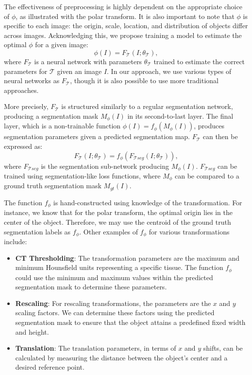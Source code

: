 The effectiveness of preprocessing is highly dependent on the appropriate choice of \(\phi\), as illustrated with the polar transform. It is also important to note that \(\phi\) is specific to each image: the origin, scale, location, and distribution of objects differ across images. Acknowledging this, we propose training a model to estimate the optimal \(\phi\) for a given image:
\begin{equation}
	\phi(I) = F_{\mathcal{T}}(I; \theta_{\mathcal{T}}),
\end{equation}
where $F_{\mathcal{T}}$ is a neural network with parameters $\theta_{\mathcal{T}}$ trained to estimate the correct parameters for $\mathcal{T}$ given an image $I$. In our approach, we use various types of neural networks as $F_{\mathcal{T}}$, though it is also possible to use more traditional approaches.

More precisely, $F_{\mathcal{T}}$ is structured similarly to a regular segmentation network, producing a segmentation mask $M_\phi(I)$ in its second-to-last layer. The final layer, which is a non-trainable function $\phi(I) = f_\phi(M_\phi(I))$, produces segmentation parameters given a predicted segmentation map. $F_{\mathcal{T}}$ can then be expressed as:
\begin{equation}
	F_{\mathcal{T}}(I; \theta_{\mathcal{T}}) = f_\phi(F_{\mathcal{T}seg}(I; \theta_{\mathcal{T}})),
\end{equation}
where $F_{\mathcal{T}seg}$ is the segmentation sub-network producing $M_\phi(I)$. $F_{\mathcal{T}seg}$ can be trained using segmentation-like loss functions, where $M_\phi$ can be compared to a ground truth segmentation mask $M_{gt}(I)$. 

The function $f_\phi$ is hand-constructed using knowledge of the transformation. For instance, we know that for the polar transform, the optimal origin lies in the center of the object. Therefore, we may use the centroid of the ground truth segmentation labels as $f_\phi$. Other examples of \( f_\phi \) for various transformations include:

\begin{itemize}
	\item \textbf{CT Thresholding}: The transformation parameters are the maximum and minimum Hounsfield units representing a specific tissue. The function \( f_\phi \) could use the minimum and maximum values within the predicted segmentation mask to determine these parameters.
	\item \textbf{Rescaling}: For rescaling transformations, the parameters are the \( x \) and \( y \) scaling factors. We can determine these factors using the predicted segmentation mask to ensure that the object attains a predefined fixed width and height.
	\item \textbf{Translation}: The translation parameters, in terms of \( x \) and \( y \) shifts, can be calculated by measuring the distance between the object's center and a desired reference point.
\end{itemize}

